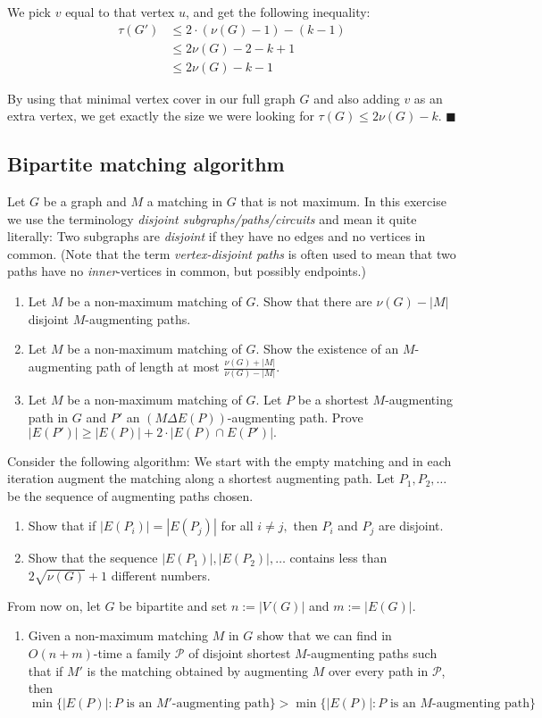 \documentclass{article}
\begin{document}
  We pick $v$ equal to that vertex $u$, and get the following inequality:
  \begin{align*}
    \tau(G') &\leq 2 \cdot (\nu(G) - 1) - (k - 1)\\
    &\leq 2\nu(G) - 2 - k + 1 \\
    &\leq 2\nu(G) - k - 1
  \end{align*}

  By using that minimal vertex cover in our full graph $G$ and also adding $v$ as an extra vertex,
  we get exactly the size we were looking for $\tau(G) \leq 2\nu(G) - k$.
  $\blacksquare$
  \subsection{Bipartite matching algorithm}
  \begin{centerframebox}
  Let $G$ be a graph and $M$ a matching in $G$ that is not maximum. In this exercise we use the terminology \textit{disjoint subgraphs/paths/circuits} and mean it
quite literally: Two subgraphs are \textit{disjoint} if they have no edges and no vertices
in common. (Note that the term \textit{vertex-disjoint paths} is often used to mean that
two paths have no \textit{inner}-vertices in common, but possibly endpoints.)
    \begin{enumerate}
        \item Let $M$ be a non-maximum matching of $G.$ Show that there are $\nu(G)-|M|$ disjoint $M$-augmenting paths.
        \item Let $M$ be a non-maximum matching of $G.$ Show the existence of an $M$-augmenting path of length at most $\frac{\nu(G)+|M|}{\nu(G)-|M|}.$
        \item Let $M$ be a non-maximum matching of $G.$ Let $P$ be a shortest $M$-augmenting path in $G$ and $P'$ an $(M\Delta E(P))$-augmenting path. Prove $|E(P')|\geq |E(P)|+2\cdot |E(P)\cap E(P')|.$
    \end{enumerate}
 Consider the following algorithm: We start with the empty matching and in each iteration augment the matching along a shortest augmenting path. Let $P_1,P_2,\dots$ be the sequence of augmenting paths chosen.
    \begin{enumerate}[resume]
        \item Show that if $|E(P_i)|=|E(P_j)|$ for all $i\neq j,$ then $P_i$ and $P_j$ are disjoint.
        \item Show that the sequence $|E(P_1)|,|E(P_2)|,\dots$ contains less than $2\sqrt{\nu(G)}+1$ different numbers.
    \end{enumerate}
    From now on, let $G$ be bipartite and set $n := |V (G)|$ and $m := |E(G)|$.
    \begin{enumerate}[resume]
        \item Given a non-maximum matching $M$ in $G$ show that we can find in $O(n+m)$-time a family $\mathcal{P}$ of disjoint shortest $M$-augmenting paths such that if $M'$ is the matching obtained by augmenting $M$ over every path in $\mathcal{P}$, then
        $$ \min\{|E(P)| : P\textrm{ is an }M'\textrm{-augmenting path}\} > \min\{|E(P)| : P\textrm{ is an }M\textrm{-augmenting path}\} $$


\end{enumerate}
\end{centerframebox}
\end{document}
